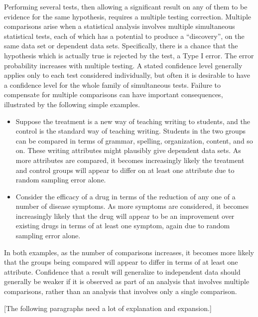 \documentclass[12pt]{article}
\begin{document}
Performing several tests, then allowing a significant result on any of
them to be evidence for the same hypothesis, requires a multiple testing
correction.  Multiple comparisons%
arise when a statistical analysis involves multiple simultaneous
statistical tests, each of which has a potential to produce a
``discovery'', on the same data set or dependent data sets.
Specifically, there is a chance that the hypothesis which is actually
true is rejected by the test, a Type I error.  The error probability
increases with multiple testing.  A stated confidence level generally
applies only to each test considered individually, but often it is
desirable to have a confidence level for the whole family of
simultaneous tests.  Failure to compensate for multiple comparisons can
have important consequences, illustrated by the following simple
examples.
\begin{itemize}
    \item
        Suppose the treatment is a new way of teaching writing to
        students, and the control is the standard way of teaching
        writing.  Students in the two groups can be compared in terms of
        grammar, spelling, organization, content, and so on.  These
        writing attributes might plausibly give dependent data sets.  As
        more attributes are compared, it becomes increasingly likely the
        treatment and control groups will appear to differ on at least
        one attribute due to random sampling error alone.
    \item
        Consider the efficacy of a drug in terms of the reduction of any
        one of a number of disease symptoms.  As more symptoms are
        considered, it becomes increasingly likely that the drug will
        appear to be an improvement over existing drugs in terms of at
        least one symptom, again due to random sampling error alone.
\end{itemize}
In both examples, as the number of comparisons increases, it becomes
more likely that the groups being compared will appear to differ in
terms of at least one attribute.  Confidence that a result will
generalize to independent data should generally be weaker if it is
observed as part of an analysis that involves multiple comparisons,
rather than an analysis that involves only a single comparison.

[The following paragraphs need a lot of explanation and expansion.]
\end{document}
